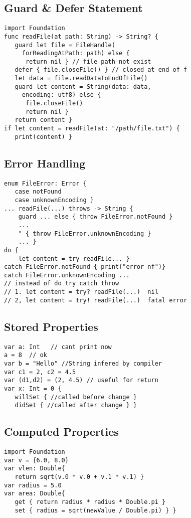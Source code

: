 \subsection{Guard \& Defer Statement}
\begin{lstlisting}
import Foundation
func readFile(at path: String) -> String? {
   guard let file = FileHandle(
     forReadingAtPath: path) else {
      return nil } // file path not exist
   defer { file.closeFile() } // closed at end of f
   let data = file.readDataToEndOfFile()
   guard let content = String(data: data,
     encoding: utf8) else {
      file.closeFile()
      return nil }
   return content }
if let content = readFile(at: "/path/file.txt") {
   print(content) }
\end{lstlisting}

\subsection{Error Handling}
\begin{lstlisting}
enum FileError: Error {
   case notFound
   case unknownEncoding }
... readFile(...) throws -> String {
	guard ... else { throw FileError.notFound }
	...
	" { throw FileError.unknownEncoding }
	... }
do {
	let content = try readFile... }
catch FileError.notFound { print("error nf")}
catch FileError.unknownEncoding ...
// instead of do try catch throw
// 1. let content = try? readFile(...)  nil
// 2, let content = try! readFile(...)  fatal error
\end{lstlisting}

\subsection{Stored Properties}
\begin{lstlisting}
var a: Int   // cant print now
a = 8  // ok
var b = "Hello" //String infered by compiler
var c1 = 2, c2 = 4.5
var (d1,d2) = (2, 4.5) // useful for return
var x: Int = 0 {
   willSet { //called before change }
   didSet { //called after change } }
\end{lstlisting}

\subsection{Computed Properties}
\begin{lstlisting}
import Foundation
var v = {6.0, 8.0}
var vlen: Double{
   return sqrt(v.0 * v.0 + v.1 * v.1) }
var radius = 5.0
var area: Double{
   get { return radius * radius * Double.pi }
   set { radius = sqrt(newValue / Double.pi) } }
\end{lstlisting}

